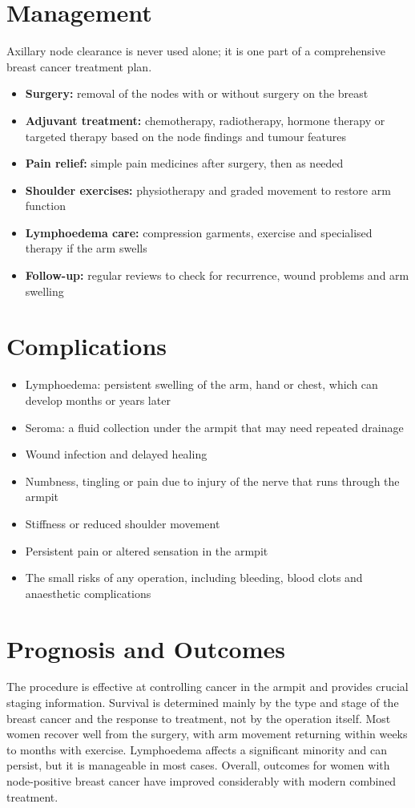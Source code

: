 \section*{Management}
Axillary node clearance is never used alone; it is one part of a comprehensive breast cancer treatment plan.

\begin{itemize}
    \item \textbf{Surgery:} removal of the nodes with or without surgery on the breast
    \item \textbf{Adjuvant treatment:} chemotherapy, radiotherapy, hormone therapy or targeted therapy based on the node findings and tumour features
    \item \textbf{Pain relief:} simple pain medicines after surgery, then as needed
    \item \textbf{Shoulder exercises:} physiotherapy and graded movement to restore arm function
    \item \textbf{Lymphoedema care:} compression garments, exercise and specialised therapy if the arm swells
    \item \textbf{Follow-up:} regular reviews to check for recurrence, wound problems and arm swelling
\end{itemize}

\section*{Complications}
\begin{itemize}
    \item Lymphoedema: persistent swelling of the arm, hand or chest, which can develop months or years later
    \item Seroma: a fluid collection under the armpit that may need repeated drainage
    \item Wound infection and delayed healing
    \item Numbness, tingling or pain due to injury of the nerve that runs through the armpit
    \item Stiffness or reduced shoulder movement
    \item Persistent pain or altered sensation in the armpit
    \item The small risks of any operation, including bleeding, blood clots and anaesthetic complications
\end{itemize}

\section*{Prognosis and Outcomes}
The procedure is effective at controlling cancer in the armpit and provides crucial staging information. Survival is determined mainly by the type and stage of the breast cancer and the response to treatment, not by the operation itself. Most women recover well from the surgery, with arm movement returning within weeks to months with exercise. Lymphoedema affects a significant minority and can persist, but it is manageable in most cases. Overall, outcomes for women with node-positive breast cancer have improved considerably with modern combined treatment.

